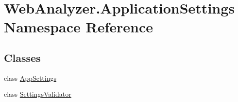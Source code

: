 \hypertarget{namespace_web_analyzer_1_1_application_settings}{}\section{Web\+Analyzer.\+Application\+Settings Namespace Reference}
\label{namespace_web_analyzer_1_1_application_settings}
\subsection*{Classes}
\begin{DoxyCompactItemize}
\item 
class \hyperlink{class_web_analyzer_1_1_application_settings_1_1_app_settings}{App\+Settings}
\item 
class \hyperlink{class_web_analyzer_1_1_application_settings_1_1_settings_validator}{Settings\+Validator}
\end{DoxyCompactItemize}
